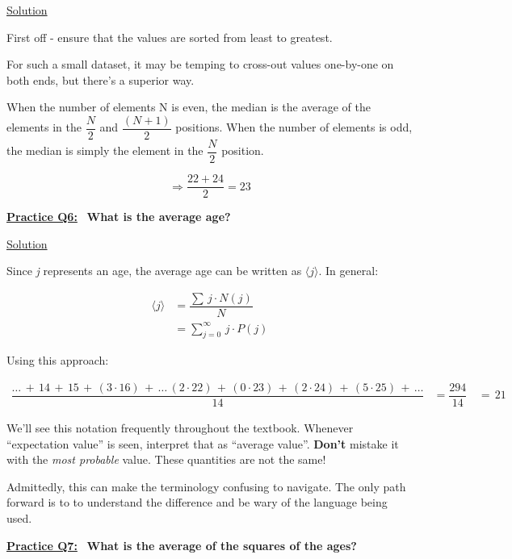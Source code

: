 \underline{Solution}

First off - ensure that the values are sorted from least to greatest.

For such a small dataset, it may be temping to cross-out values one-by-one on
both ends, but there's a superior way.

When the number of elements N is even, the median is the average of the elements
in the $\dfrac{N}{2}$ and $\dfrac{(N+1)}{2}$ positions. When the number of
elements is odd, the median is simply the element in the $\dfrac{N}{2}$
position.

\[
    \Rightarrow \dfrac{22+24}{2} = \boxed{23}
\]

\bigskip \bigskip

\underline{\textbf{Practice Q6:}} \ \textbf{What is the average age?}

\bigskip

\underline{Solution}

Since \textit{j} represents an age, the average age can be written as
$\langle j \rangle$. In general:

\begin{align*}
    \langle j \rangle &= \dfrac{\sum \, j \cdot N(j)}{N} \\[1.5ex]
    &= \sum_{j=0}^{\infty} \, j \cdot P(j)
\end{align*}

\newpage

Using this approach:

\begin{align*}
    \dfrac{\dots \, + \, 14 \, + \, 15 \, + \, (3 \cdot 16) \, + \, \dots \,
        (2 \cdot 22) \, + \, (0 \cdot 23) \, + \, (2 \cdot 24) \, + \,
        (5 \cdot 25) \, + \, \dots}{14} &= \dfrac{294}{14}
    \, &= \, \boxed{21}
\end{align*}

\bigskip

We'll see this notation frequently throughout the textbook. Whenever ``expectation value'' is seen, interpret that as
``average value''. \textbf{Don't} mistake it with the \textit{most probable} value. These quantities are not the same!


Admittedly, this can make the terminology confusing to navigate. The only path forward is to to understand the
difference and be wary of the language being used.

\bigskip \bigskip

\underline{\textbf{Practice Q7:}} \ \textbf{What is the average of the squares of the ages?}

